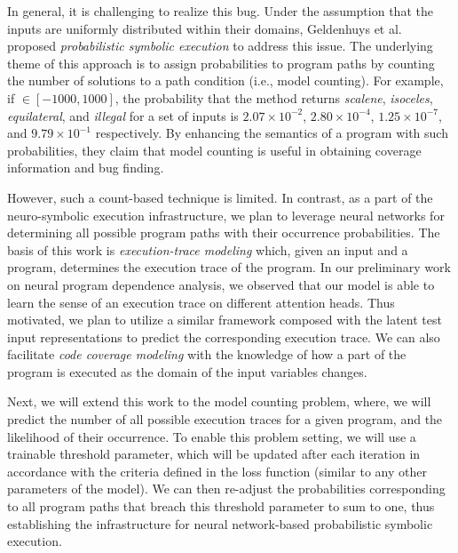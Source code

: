 In general, it is challenging to realize this bug. Under the assumption that the inputs are uniformly distributed within their domains, Geldenhuys et al.~\cite{10.1145/2338965.2336773} proposed {\em probabilistic symbolic execution} to address this issue. The underlying theme of this approach is to assign probabilities to program paths by counting the number of solutions to a path condition (i.e., model counting). For example, if  $\in [-1000, 1000]$, the probability that the method  returns \textit{scalene}, \textit{isoceles}, \textit{equilateral}, and \textit{illegal} for a set of inputs is $2.07 \times 10^{-2}$, $2.80 \times 10^{-4}$, $1.25 \times 10^{-7}$, and $9.79 \times 10^{-1}$ respectively. By enhancing the semantics of a program with such probabilities, they claim that model counting is useful in obtaining coverage information and bug finding.




However, such a count-based technique is limited. In contrast, as a part of the neuro-symbolic execution infrastructure, we plan to leverage neural networks for determining all possible program paths with their occurrence probabilities. The basis of this work is {\em execution-trace modeling} which, given an input and a program, determines the execution trace of the program. In our preliminary work on neural program dependence analysis, we observed that our model is able to learn the sense of an execution trace on different attention heads. Thus motivated, we plan to utilize a similar framework composed with the latent test input representations to predict the corresponding execution trace. We can also facilitate {\em code coverage modeling} with the knowledge of how a part of the program is executed as the domain of the input variables changes. 

Next, we will extend this work to the model counting problem, where, we will predict the number of all possible execution traces for a given program, and the likelihood of their occurrence. To enable this problem setting, we will use a trainable threshold parameter, which will be updated after each iteration in accordance with the criteria defined in the loss function (similar to any other parameters of the model). We can then re-adjust the probabilities corresponding to all program paths that breach this threshold parameter to sum to one, thus establishing the infrastructure for neural network-based probabilistic symbolic execution.  
